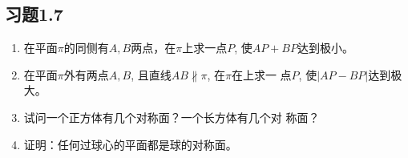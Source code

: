 \begin{solution}
    
\end{solution}

\begin{example}
    
\end{example}

\begin{solution}
    
\end{solution}

\begin{example}
    
\end{example}

\begin{solution}
    
\end{solution}

\begin{example}
    
\end{example}

\begin{solution}
    
\end{solution}
\begin{example}
    
\end{example}


\begin{solution}
    
\end{solution}






\subsection*{习题1.7}
\begin{enumerate}
    \item 在平面$\pi$的同侧有$A,B$两点，在$\pi$上求一点$P$, 使$AP+
    BP$达到极小。
    \item 在平面$\pi$外有两点$A,B$, 且直线$AB\nparallel \pi$, 在$\pi$在上求一
    点$P$, 使$|AP-BP|$达到极大。
    \item 试问一个正方体有几个对称面？一个长方体有几个对
    称面？
    \item 证明：任何过球心的平面都是球的对称面。
\end{enumerate}

